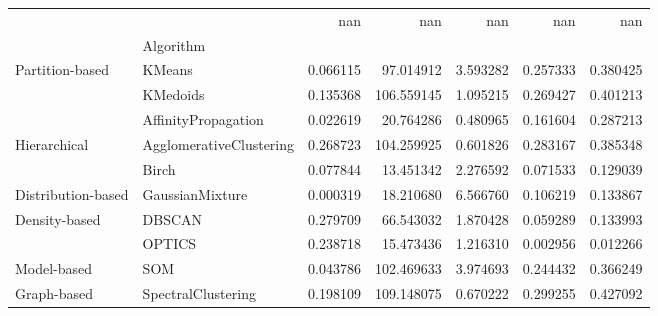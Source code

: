 \begin{tabular}{llrrrrr}
 &  & nan & nan & nan & nan & nan \\
 & Algorithm &  &  &  &  &  \\
\multirow[c]{3}{*}{Partition-based} & KMeans & 0.066115 & 97.014912 & 3.593282 & 0.257333 & 0.380425 \\
 & KMedoids & 0.135368 & 106.559145 & 1.095215 & 0.269427 & 0.401213 \\
 & AffinityPropagation & 0.022619 & 20.764286 & 0.480965 & 0.161604 & 0.287213 \\
\multirow[c]{2}{*}{Hierarchical} & AgglomerativeClustering & 0.268723 & 104.259925 & 0.601826 & 0.283167 & 0.385348 \\
 & Birch & 0.077844 & 13.451342 & 2.276592 & 0.071533 & 0.129039 \\
Distribution-based & GaussianMixture & 0.000319 & 18.210680 & 6.566760 & 0.106219 & 0.133867 \\
\multirow[c]{2}{*}{Density-based} & DBSCAN & 0.279709 & 66.543032 & 1.870428 & 0.059289 & 0.133993 \\
 & OPTICS & 0.238718 & 15.473436 & 1.216310 & 0.002956 & 0.012266 \\
Model-based & SOM & 0.043786 & 102.469633 & 3.974693 & 0.244432 & 0.366249 \\
Graph-based & SpectralClustering & 0.198109 & 109.148075 & 0.670222 & 0.299255 & 0.427092 \\
\end{tabular}
